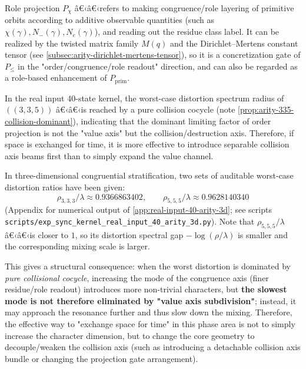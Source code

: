 \begin{definition}\label{def:pom-proj-chi}
Role projection $P_\chi$ â€‹â€‹refers to making congruence/role layering of primitive orbits according to additive observable quantities (such as $\chi(\gamma),N_-(\gamma),N_e(\gamma)$), and reading out the residue class label. It can be realized by the twisted matrix family $M(q)$ and the Dirichlet--Mertens constant tensor (see \ref{subsec:arity-dirichlet-mertens-tensor}), so it is a concretization gate of $P_{\le}$ in the "order/congruence/role readout" direction, and can also be regarded as a role-based enhancement of $P_{\mathrm{prim}}$.
\end{definition}

\begin{remark}\label{rem:pom-collision-axis}
In the real input 40-state kernel, the worst-case distortion spectrum radius of \(((3,3,5))\) â€‹â€‹is reached by a pure collision cocycle (note \ref{prop:arity-335-collision-dominant}), indicating that the dominant limiting factor of order projection is not the "value axis" but the collision/destruction axis. Therefore, if space is exchanged for time, it is more effective to introduce separable collision axis beams first than to simply expand the value channel.
\end{remark}

\begin{remark}\label{rem:pom-more-axis-slower}
In three-dimensional congruential stratification, two sets of auditable worst-case distortion ratios have been given:
\[
\rho_{3,3,3}/\lambda\approx 0.9366863402,
\qquad
\rho_{5,5,5}/\lambda\approx 0.9628140340
\]
(Appendix for numerical output of \ref{app:real-input-40-arity-3d}; see scripts \texttt{scripts/exp\_sync\_kernel\_real\_input\_40\_arity\_3d.py}).
Note that \(\rho_{5,5,5}/\lambda\) â€‹â€‹is closer to \(1\), so its distortion spectral gap \(-\log(\rho/\lambda)\) is smaller and the corresponding mixing scale is larger.

This gives a structural consequence: when the worst distortion is dominated by \emph{pure collisional cocycle}, increasing the mode of the congruence axis (finer residue/role readout) introduces more non-trivial characters, but \textbf{the slowest mode is not therefore eliminated by "value axis subdivision"}; instead, it may approach the resonance further and thus slow down the mixing.
Therefore, the effective way to "exchange space for time" in this phase area is not to simply increase the character dimension, but to change the core geometry to decouple/weaken the collision axis (such as introducing a detachable collision axis bundle or changing the projection gate arrangement).
\end{remark}

